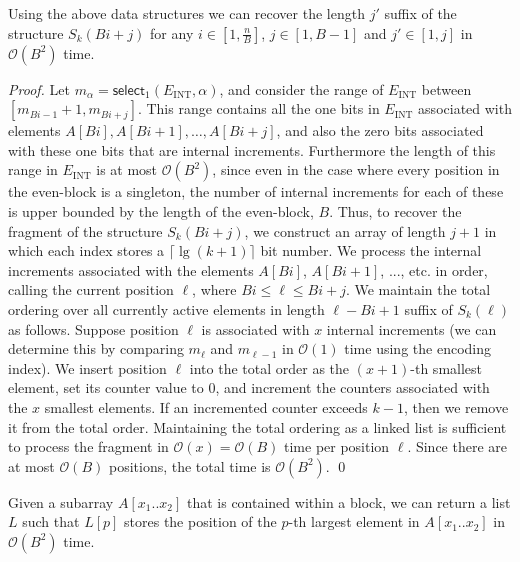 \documentclass[runningheads]{llncs}
\def\selop{\textsf{select}}
\newcommand{\Oh}{\mathcal{O}}
\begin{document}
\begin{lemma}\label{lem:subarray-enc}
Using the above data structures we can recover the length $j'$ suffix
of the structure $S_k(Bi + j)$ for any $i \in [1,\frac{n}{B}]$, $j \in
[1,B-1]$ and $j' \in [1,j]$ in $\Oh(B^2)$ time.
\end{lemma}

\begin{proof}
Let $m_\alpha = \selop_1(E_{\text{INT}},\alpha)$, and consider the
range of $E_{\text{INT}}$ between $[m_{Bi-1}+1,m_{Bi+j}]$.  This range
contains all the one bits in $E_\text{INT}$ associated with elements
$A[Bi], A[Bi + 1], \ldots, A[Bi+j]$, and also the zero bits associated
with these one bits that are internal increments.  Furthermore the
length of this range in $E_\text{INT}$ is at most $\Oh(B^2)$, since
even in the case where every position in the even-block is a
singleton, the number of internal increments for each of these is
upper bounded by the length of the even-block, $B$.  Thus, to recover
the fragment of the structure $S_k(Bi+j)$, we construct an array of
length $j +1$ in which each index stores a $\lceil \lg (k+1) \rceil$
bit number.  We process the internal increments associated with the
elements $A[Bi]$, $A[Bi +1]$, ..., etc. in order, calling the current
position $\ell$, where $Bi \le \ell \le Bi +j$. We maintain the total
ordering over all currently active elements in length $\ell - Bi +1$
suffix of $S_k(\ell)$ as follows.  Suppose position $\ell$ is
associated with $x$ internal increments (we can determine this by
comparing $m_{\ell}$ and $m_{\ell-1}$ in $\Oh(1)$ time using the
encoding index).  We insert position $\ell$ into the total order as
the $(x +1)$-th smallest element, set its counter value to $0$, and
increment the counters associated with the $x$ smallest elements.  If
an incremented counter exceeds $k -1$, then we remove it from the
total order.  Maintaining the total ordering as a linked list is
sufficient to process the fragment in $\Oh(x)=\Oh(B)$ time per
position $\ell$.  Since there are at most $\Oh(B)$ positions, the
total time is $\Oh(B^2)$. \qed
\end{proof}



\begin{lemma}\label{lem:subarray-query}
Given a subarray $A[x_1..x_2]$ that is contained within a block, we
can return a list $L$ such that $L[p]$ stores the position of the
$p$-th largest element in $A[x_1..x_2]$ in $\Oh(B^2)$ time.
\end{lemma}
\end{document}
